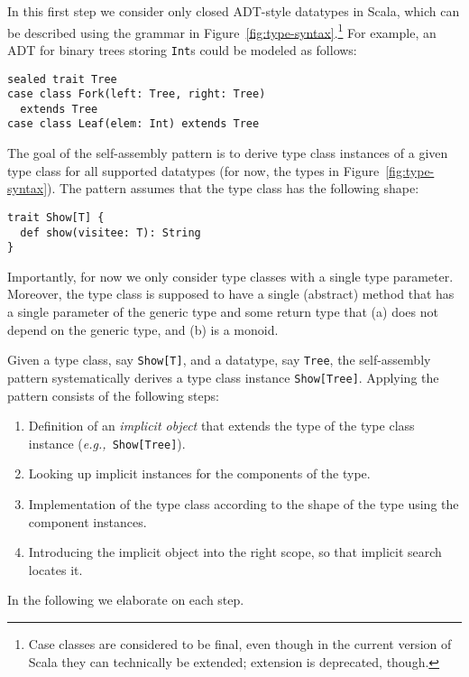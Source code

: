 \documentclass[preprint]{sigplanconf}
\newcommand{\eg}{{\em e.g.,~}}
\begin{document}
In this first step we consider only closed ADT-style datatypes in Scala, which
can be described using the grammar in Figure~\ref{fig:type-syntax}.\footnote{Case
classes are considered to be final, even though in the current version of Scala
they can technically be extended; extension is deprecated, though.} For example,
an ADT for binary trees storing \verb|Int|s could be modeled as follows:

\begin{lstlisting}
sealed trait Tree
case class Fork(left: Tree, right: Tree)
  extends Tree
case class Leaf(elem: Int) extends Tree
\end{lstlisting}
\noindent
The goal of the self-assembly pattern is to derive type class instances of a
given type class for all supported datatypes (for now, the types in
Figure~\ref{fig:type-syntax}). The pattern assumes that the type class has the
following shape:
\begin{lstlisting}
trait Show[T] {
  def show(visitee: T): String
}
\end{lstlisting}
\noindent
Importantly, for now we only consider type classes with a single type
parameter. Moreover, the type class is supposed to have a single (abstract)
method that has a single parameter of the generic type and some return type
that (a) does not depend on the generic type, and (b) is a monoid.

Given a type class, say \verb|Show[T]|, and a datatype, say \verb|Tree|, the
self-assembly pattern systematically derives a type class instance
\verb|Show[Tree]|. Applying the pattern consists of the following steps:

\begin{enumerate}

\item Definition of an \emph{implicit object} that extends the type of the
      type class instance (\eg \verb|Show[Tree]|).

\item Looking up implicit instances for the components of the type.

\item Implementation of the type class according to the shape of the type
      using the component instances.

\item Introducing the implicit object into the right scope, so that implicit
      search locates it.

\end{enumerate}
\noindent
In the following we elaborate on each step.
\end{document}
